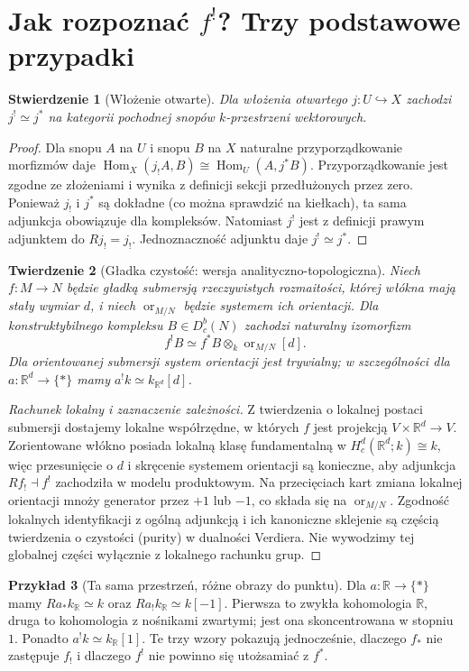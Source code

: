 \documentclass[11pt,a4paper,oneside]{report}
\newcommand{\R}{\mathbb{R}}
\theoremstyle{plain}
\newtheorem{twierdzenie}{Twierdzenie}[section]
\newtheorem{stwierdzenie}[twierdzenie]{Stwierdzenie}
\theoremstyle{definition}
\newtheorem{przyklad}[twierdzenie]{Przykład}
\theoremstyle{remark}
\begin{document}
\section{Jak rozpoznać $f^!$? Trzy podstawowe przypadki}
\begin{stwierdzenie}[Włożenie otwarte]
\label{prop:xvi-open-shriek}
Dla włożenia otwartego $j:U\hookrightarrow X$ zachodzi
$j^!\simeq j^*$ na kategorii pochodnej snopów $k$-przestrzeni
wektorowych.
\end{stwierdzenie}
\begin{proof}
Dla snopu $A$ na $U$ i snopu $B$ na $X$ naturalne
przyporządkowanie morfizmów daje
$\operatorname{Hom}_X(j_!A,B)\cong
\operatorname{Hom}_U(A,j^*B)$.
Przyporządkowanie jest zgodne ze złożeniami i wynika
z definicji sekcji przedłużonych przez zero.
Ponieważ $j_!$ i $j^*$ są dokładne (co można sprawdzić
na kiełkach), ta sama adjunkcja obowiązuje dla kompleksów.
Natomiast $j^!$ jest z definicji prawym adjunktem do $Rj_!=j_!$.
Jednoznaczność adjunktu daje $j^!\simeq j^*$.
\end{proof}

\begin{twierdzenie}[Gładka czystość: wersja analityczno-topologiczna]
\label{thm:xvi-smooth-purity}
Niech $f:M\to N$ będzie gładką submersją rzeczywistych
rozmaitości, której włókna mają stały wymiar $d$, i niech
$\operatorname{or}_{M/N}$ będzie systemem ich orientacji.
Dla konstruktybilnego kompleksu $B\in D^b_c(N)$ zachodzi
naturalny izomorfizm
\[
 f^!B\simeq f^*B\otimes_k\operatorname{or}_{M/N}[d].
\]
Dla orientowanej submersji system orientacji jest trywialny;
w szczególności dla $a:\R^d\to\{*\}$ mamy
$a^!k\simeq k_{\R^d}[d]$.
\end{twierdzenie}
\begin{proof}[Rachunek lokalny i zaznaczenie zależności]
Z twierdzenia o lokalnej postaci submersji dostajemy
lokalne współrzędne, w których $f$ jest projekcją
$V\times\R^d\to V$. Zorientowane włókno posiada lokalną
klasę fundamentalną w
$H_c^d(\R^d;k)\cong k$, więc przesunięcie o $d$
i skręcenie systemem orientacji są konieczne, aby
adjunkcja $Rf_!\dashv f^!$ zachodziła w modelu
produktowym. Na przecięciach kart zmiana lokalnej
orientacji mnoży generator przez $+1$ lub $-1$,
co składa się na $\operatorname{or}_{M/N}$.
Zgodność lokalnych identyfikacji z ogólną adjunkcją i
ich kanoniczne sklejenie są częścią twierdzenia o
czystości (purity) w dualności Verdiera. Nie wywodzimy
tej globalnej części wyłącznie z lokalnego rachunku grup.
\end{proof}
\begin{przyklad}[Ta sama przestrzeń, różne obrazy do punktu]
Dla $a:\R\to\{*\}$ mamy
$Ra_*k_{\R}\simeq k$ oraz $Ra_!k_{\R}\simeq k[-1]$.
Pierwsza to zwykła kohomologia $\R$, druga to
kohomologia z nośnikami zwartymi; jest ona skoncentrowana
w stopniu $1$. Ponadto $a^!k\simeq k_{\R}[1]$.
Te trzy wzory pokazują jednocześnie, dlaczego
$f_*$ nie zastępuje $f_!$ i dlaczego $f^!$
nie powinno się utożsamiać z $f^*$.
\end{przyklad}
\end{document}
